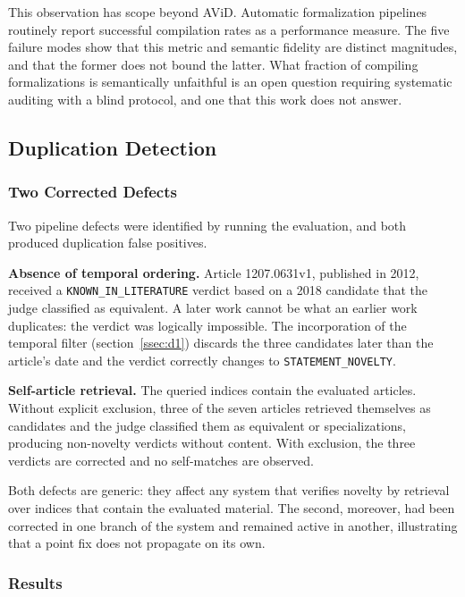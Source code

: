 \documentclass{article}
\theoremstyle{remark}
\begin{document}
This observation has scope beyond AViD. Automatic formalization pipelines routinely report successful compilation rates as a performance measure. The five failure modes show that this metric and semantic fidelity are distinct magnitudes, and that the former does not bound the latter. What fraction of compiling formalizations is semantically unfaithful is an open question requiring systematic auditing with a blind protocol, and one that this work does not answer.

\subsection{Duplication Detection}

\subsubsection{Two Corrected Defects}

Two pipeline defects were identified by running the evaluation, and both produced duplication false positives.

\textbf{Absence of temporal ordering.} Article 1207.0631v1, published in 2012, received a \texttt{KNOWN\_IN\_LITERATURE} verdict based on a 2018 candidate that the judge classified as equivalent. A later work cannot be what an earlier work duplicates: the verdict was logically impossible. The incorporation of the temporal filter (section~\ref{ssec:d1}) discards the three candidates later than the article's date and the verdict correctly changes to \texttt{STATEMENT\_NOVELTY}.

\textbf{Self-article retrieval.} The queried indices contain the evaluated articles. Without explicit exclusion, three of the seven articles retrieved themselves as candidates and the judge classified them as equivalent or specializations, producing non-novelty verdicts without content. With exclusion, the three verdicts are corrected and no self-matches are observed.

Both defects are generic: they affect any system that verifies novelty by retrieval over indices that contain the evaluated material. The second, moreover, had been corrected in one branch of the system and remained active in another, illustrating that a point fix does not propagate on its own.

\subsubsection{Results}
\end{document}
